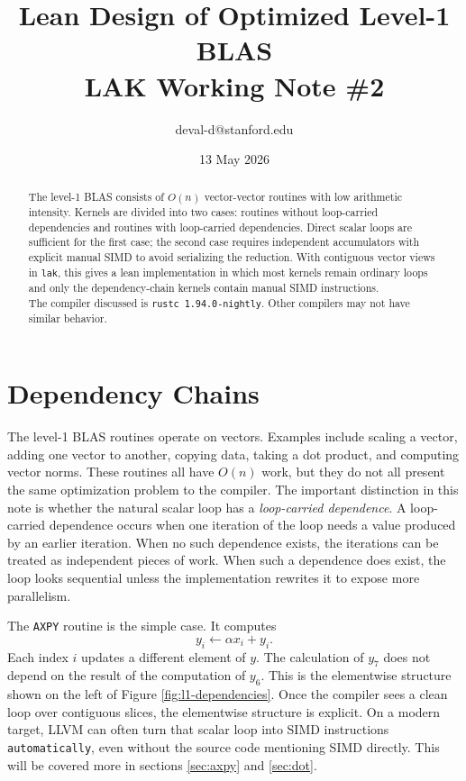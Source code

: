 \documentclass[11pt]{article}
\title{
  Lean Design of Optimized Level-1 BLAS \\[0.25em]
  \large LAK Working Note \#2
}
\author{
  deval-d@stanford.edu 
}
\date{13 May 2026}
\begin{document}
\maketitle
\thispagestyle{empty} 

\begin{abstract}
The level-1 BLAS consists of $O(n)$ vector-vector routines with low arithmetic
intensity. Kernels are divided into two cases: routines without
loop-carried dependencies and routines with loop-carried dependencies. Direct
scalar loops are sufficient for the first case; the second case requires
independent accumulators with explicit manual SIMD to avoid serializing
the reduction. With contiguous vector views in \texttt{lak}, this gives a lean
implementation in which most kernels remain ordinary loops and only the
dependency-chain kernels contain manual SIMD instructions. \\[0.1em]

\noindent The compiler discussed is \texttt{rustc 1.94.0-nightly}. Other compilers may not have similar behavior.
\end{abstract}

\section{Dependency Chains} 

The level-1 BLAS routines operate on vectors. Examples include scaling a vector, adding one vector to another, 
copying data, taking a dot product, and computing vector norms. These routines all have $O(n)$ work, but they 
do not all present the same optimization problem to the compiler. 
The important distinction in this note is whether the natural scalar loop has
a \textit{loop-carried dependence}. A loop-carried dependence occurs when one
iteration of the loop needs a value produced by an earlier iteration. When no
such dependence exists, the iterations can be treated as independent pieces of
work. When such a dependence does exist, the loop looks sequential unless the
implementation rewrites it to expose more parallelism.

The \texttt{AXPY} routine is the simple case. It computes 
\begin{equation}
    y_i \leftarrow \alpha x_i + y_i. 
\end{equation}
Each index $i$ updates a different element of $y$. The calculation of $y_7$ does not depend on the 
result of the computation of $y_6$. This is the elementwise structure shown on the left of Figure \ref{fig:l1-dependencies}.
Once the compiler sees a clean loop over contiguous slices, the 
elementwise structure is explicit. On a modern target, LLVM can often turn that scalar loop into SIMD 
instructions \texttt{automatically}, even without the source code mentioning SIMD directly. 
This will be covered more in sections \ref{sec:axpy} and \ref{sec:dot}. 
\end{document}
